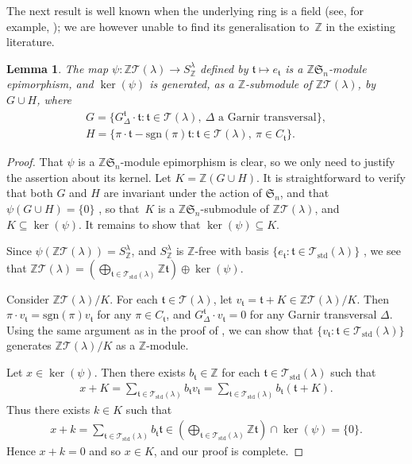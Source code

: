 \documentclass[11pt]{article}
\newtheorem{Lemma}[Theorem]{Lemma}
\renewcommand{\t}{\mathfrak{t}}
\newcommand{\TT}{\mathscr{T}}
\newcommand{\sgn}{\mathrm{sgn}}
\newcommand{\sym}[1]{\mathfrak{S}_{#1}}
\newcommand{\Z}{\mathbb{Z}}
\begin{document}
The next result is well known when the underlying ring is a field (see, for example, \cite[Section~7.4, Corollary, p.~101]{WF}); we are however unable to find its generalisation to~$\mathbb{Z}$ in the existing literature.

\begin{Lemma}\label{L: annihilator for specht}
The map $\psi\colon \Z\TT(\lambda) \to S_\Z^\lambda$ defined by $\t \mapsto e_{\t}$ is a $\Z\sym{n}$-module epimorphism, and $\ker(\psi)$ is generated, as a $\Z$-submodule of $\Z\TT(\lambda)$, by $G \cup H$, where
\begin{gather*}
G= \big\{ G_{\Delta}^{\t} \cdot \t \colon \t \in \TT(\lambda),\ \Delta \text{ a Garnir transversal} \big\}, \\
H= \{ \pi \cdot \t - \sgn(\pi)\t \colon \t \in \TT(\lambda),\ \pi \in C_{\t} \}.
\end{gather*}
\end{Lemma}

\begin{proof}That $\psi$ is a $\Z\sym{n}$-module epimorphism is clear, so we only need to justify the assertion about its kernel. Let $K = \Z(G\cup H)$. It is straightforward to verify that both $G$ and $H$ are invariant under the action of $\sym{n}$, and that $\psi(G \cup H) = \{0\}$ \cite[7.2.1 and Theorem~7.2.3]{GJAK}, so that~$K$ is a $\Z\sym{n}$-submodule of $\Z\TT(\lambda)$, and $K \subseteq \ker(\psi)$. It remains to show that $\ker(\psi) \subseteq K$.

Since $\psi(\Z\TT(\lambda)) = S^{\lambda}_\Z$, and $S_\Z^{\lambda}$ is $\Z$-free with basis $\{ e_{\t} \colon \t \in \TT_{\mathrm{std}}(\lambda) \}$ \cite[Theorem~1.1]{Peel}, we see that $\Z\TT(\lambda) = (\bigoplus_{\t \in \TT_{\mathrm{std}}(\lambda)} \Z\t)\oplus \ker(\psi)$.

Consider $\Z\TT(\lambda)/K$. For each $\t \in \TT(\lambda)$, let $v_{\t} = \t + K \in \Z\TT(\lambda)/K$. Then $\pi\cdot v_\t = \sgn(\pi)v_\t$ for any $\pi \in C_{\t}$, and $G_{\Delta}^{\t} \cdot v_\t = 0$ for any Garnir transversal $\Delta$. Using the same argument as in the proof of \cite[Theorem~7.2.7]{GJAK}, we can show that $\{ v_{\t} \colon \t \in \TT_{\mathrm{std}}(\lambda) \}$ generates $\Z\TT(\lambda)/K$ as a $\Z$-module.

Let $x \in \ker(\psi)$. Then there exists $b_{\t} \in \Z$ for each $\t \in \TT_{\mathrm{std}}(\lambda)$ such that \begin{gather*}x+K = \sum_{\t \in \TT_{\mathrm{std}}(\lambda)} b_{\t}v_{\t} = \sum_{\t \in \TT_{\mathrm{std}}(\lambda)} b_{\t}(\t + K).\end{gather*}
Thus there exists $k \in K$ such that \begin{gather*}x + k = \sum_{\t \in \TT_{\mathrm{std}}(\lambda)} b_{\t}\t \in \left (\bigoplus_{\t \in \TT_{\mathrm{std}}(\lambda)} \Z\t\right ) \cap \ker(\psi) = \{0\}.\end{gather*} Hence $x + k = 0$ and so $x \in K$, and our proof is complete.
\end{proof}
\end{document}
